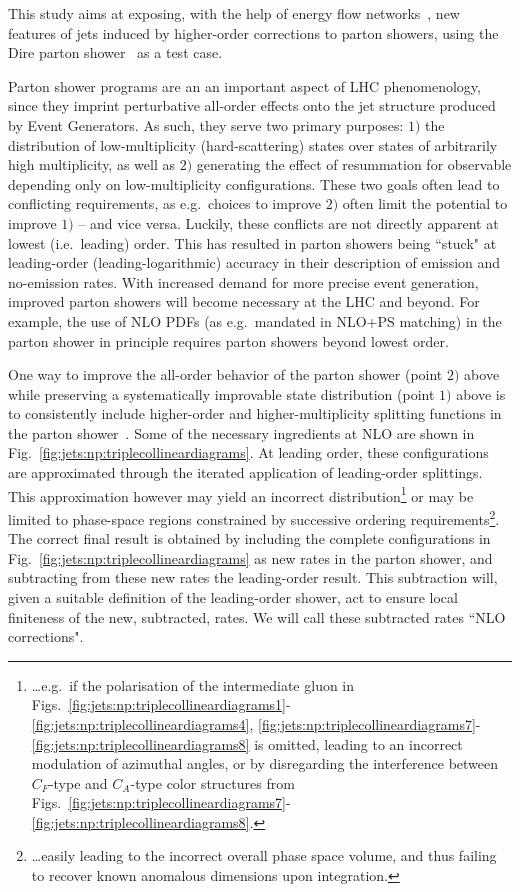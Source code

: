 
This study aims at exposing, with the help of energy flow 
networks~\cite{Komiske:2018cqr}, new features of jets induced by higher-order
corrections to parton showers, using the Dire parton shower~\cite{Hoche:2015sya}
as a test case.

Parton shower programs are an an important aspect
of LHC phenomenology, since they imprint perturbative all-order effects onto the
jet structure produced by Event Generators. As such, they serve two primary
purposes: $1)$ the distribution of low-multiplicity
(hard-scattering) states over states of arbitrarily high multiplicity, as well
as $2)$ generating the effect of resummation for observable depending only on 
low-multiplicity configurations. These two goals often lead to conflicting
requirements, as e.g.\ choices to improve
$2)$ often limit the potential to improve $1)$ -- and vice versa. Luckily,
these conflicts are not directly apparent at lowest (i.e.\ leading) order. This
has resulted in parton showers being ``stuck" at leading-order 
(leading-logarithmic) accuracy in their description of emission and 
no-emission rates. With increased demand for more precise event generation, 
improved parton showers will become necessary at the LHC and beyond. For 
example, the use of NLO PDFs (as e.g.\ mandated in NLO+PS
matching) in the parton shower in principle requires parton showers beyond
lowest order.

One way to improve the all-order behavior of the parton shower (point $2)$ 
above while preserving a systematically improvable state distribution (point $1)$ 
above is to consistently include higher-order and higher-multiplicity 
splitting functions in the parton 
shower~\cite{Li:2016yez, Hoche:2017iem,Dulat:2018vuy}. Some of the 
necessary ingredients at NLO are shown in 
Fig.~\ref{fig:jets:np:triplecollineardiagrams}. 
At leading order, these configurations are approximated through the iterated 
application of leading-order splittings. This approximation however may
yield an incorrect distribution\footnote{\dots e.g.\ if the polarisation of 
the intermediate gluon in 
Figs.~\ref{fig:jets:np:triplecollineardiagrams1}-\ref{fig:jets:np:triplecollineardiagrams4},
\ref{fig:jets:np:triplecollineardiagrams7}-\ref{fig:jets:np:triplecollineardiagrams8}
is omitted, leading to an incorrect modulation of azimuthal angles,
or by disregarding the interference between
$C_F$-type and $C_A$-type color structures from 
Figs.~\ref{fig:jets:np:triplecollineardiagrams7}-\ref{fig:jets:np:triplecollineardiagrams8}.}
or may be limited to phase-space regions constrained by successive 
ordering requirements\footnote{\dots easily leading to the 
incorrect overall phase space volume, and thus failing to recover known anomalous
dimensions upon integration.}.
The correct final result is obtained by including the 
complete configurations in Fig.~\ref{fig:jets:np:triplecollineardiagrams}
as new rates in the parton shower, and subtracting from these new rates
the leading-order result. This subtraction will, given a suitable definition
of the leading-order shower, act to ensure local finiteness of the new, 
subtracted, rates. We will call these subtracted rates ``NLO corrections".

